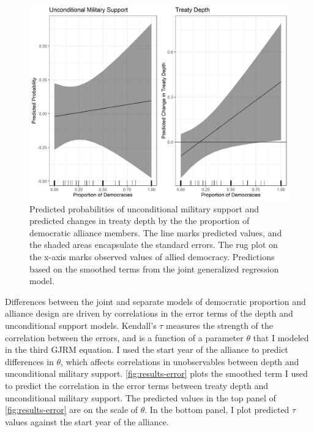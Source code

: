 \documentclass[12pt]{article}
\begin{document}
\begin{figure}
\includegraphics[width=.95\textwidth]{results-prop.png}  
\caption{Predicted probabilities of unconditional military support and predicted changes in treaty depth by the the proportion of democratic alliance members. The line marks predicted values, and the shaded areas encapsulate the standard errors. The rug plot on the x-axis marks observed values of allied democracy. Predictions based on the smoothed terms from the joint generalized regression model.}
\label{fig:results-prop}
\end{figure}



Differences between the joint and separate models of democratic proportion and alliance design are driven by correlations in the error terms of the depth and unconditional support models.  
Kendall's $\tau$ measures the strength of the correlation between the errors, and is a function of a parameter $\theta$ that I modeled in the third GJRM equation.
I used the start year of the alliance to predict differences in $\theta$, which affects correlations in unobservables between depth and unconditional military support. 
\autoref{fig:results-error} plots the smoothed term I used to predict the correlation in the error terms between treaty depth and unconditional military support. 
The predicted values in the top panel of \autoref{fig:results-error} are on the scale of $\theta$. 
In the bottom panel, I plot predicted $\tau$ values against the start year of the alliance. 
\end{document}
